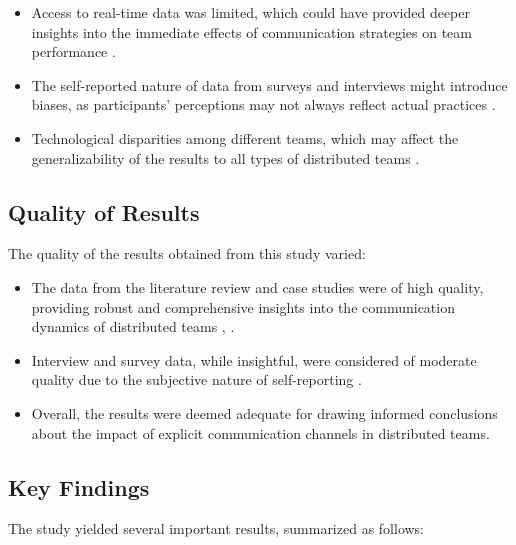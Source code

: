 \documentclass[12pt]{article}
\begin{document}
\begin{itemize}
    \item Access to real-time data was limited, which could have provided deeper insights into the immediate effects of communication strategies on team performance \cite{ref9}.
    \item The self-reported nature of data from surveys and interviews might introduce biases, as participants' perceptions may not always reflect actual practices \cite{ref7}.
    \item Technological disparities among different teams, which may affect the generalizability of the results to all types of distributed teams \cite{ref4}.
\end{itemize}

\subsection{Quality of Results}
The quality of the results obtained from this study varied:

\begin{itemize}
    \item The data from the literature review and case studies were of high quality, providing robust and comprehensive insights into the communication dynamics of distributed teams \cite{ref1}, \cite{ref6}.
    \item Interview and survey data, while insightful, were considered of moderate quality due to the subjective nature of self-reporting \cite{ref10}.
    \item Overall, the results were deemed adequate for drawing informed conclusions about the impact of explicit communication channels in distributed teams.
\end{itemize}

\subsection{Key Findings}
The study yielded several important results, summarized as follows:
\end{document}
